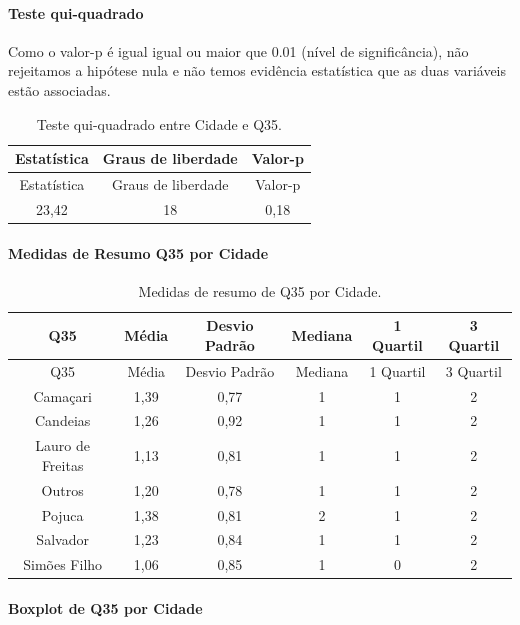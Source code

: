 \documentclass[]{article}
\let\oldparagraph\paragraph
\renewcommand{\paragraph}[1]{\oldparagraph{#1}\mbox{}}
\begin{document}
\hypertarget{teste-qui-quadrado-107}{%
\paragraph{Teste qui-quadrado}\label{teste-qui-quadrado-107}}

Como o valor-p é igual igual ou maior que 0.01 (nível de significância), não rejeitamos a hipótese nula e não temos evidência estatística que as duas variáveis estão associadas.

\begin{longtable}[]{@{}ccc@{}}
\caption{\label{tab:unnamed-chunk-1254}Teste qui-quadrado entre Cidade e Q35.}\tabularnewline
\toprule
Estatística & Graus de liberdade & Valor-p\tabularnewline
\midrule
\endfirsthead
\toprule
Estatística & Graus de liberdade & Valor-p\tabularnewline
\midrule
\endhead
23,42 & 18 & 0,18\tabularnewline
\bottomrule
\end{longtable}

\cleardoublepage

\hypertarget{medidas-de-resumo-q35-por-cidade}{%
\paragraph{Medidas de Resumo Q35 por Cidade}\label{medidas-de-resumo-q35-por-cidade}}

\begin{longtable}[]{@{}cccccc@{}}
\caption{\label{tab:unnamed-chunk-1255}Medidas de resumo de Q35 por Cidade.}\tabularnewline
\toprule
Q35 & Média & Desvio Padrão & Mediana & 1 Quartil & 3 Quartil\tabularnewline
\midrule
\endfirsthead
\toprule
Q35 & Média & Desvio Padrão & Mediana & 1 Quartil & 3 Quartil\tabularnewline
\midrule
\endhead
Camaçari & 1,39 & 0,77 & 1 & 1 & 2\tabularnewline
Candeias & 1,26 & 0,92 & 1 & 1 & 2\tabularnewline
Lauro de Freitas & 1,13 & 0,81 & 1 & 1 & 2\tabularnewline
Outros & 1,20 & 0,78 & 1 & 1 & 2\tabularnewline
Pojuca & 1,38 & 0,81 & 2 & 1 & 2\tabularnewline
Salvador & 1,23 & 0,84 & 1 & 1 & 2\tabularnewline
Simões Filho & 1,06 & 0,85 & 1 & 0 & 2\tabularnewline
\bottomrule
\end{longtable}

\hypertarget{boxplot-de-q35-por-cidade}{%
\paragraph{Boxplot de Q35 por Cidade}\label{boxplot-de-q35-por-cidade}}
\end{document}
